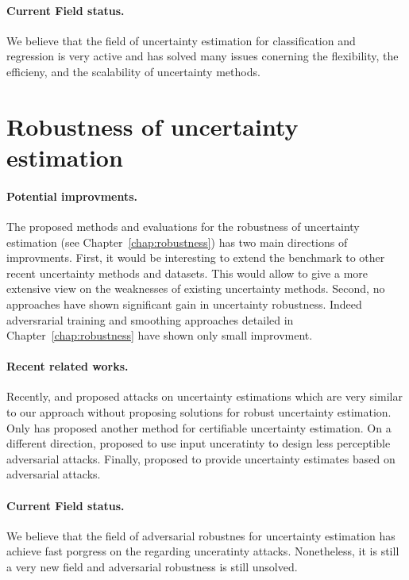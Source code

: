 \paragraph{Current Field status.} We believe that the field of uncertainty estimation for classification and regression is very active and has solved many issues conerning the flexibility, the efficieny, and the scalability of uncertainty methods.

\section{Robustness of uncertainty estimation} 

\paragraph{Potential improvments.} The proposed methods and evaluations for the robustness of uncertainty estimation (see Chapter~\ref{chap:robustness}) has two main directions of improvments. First, it would be interesting to extend the benchmark to other recent uncertainty methods and datasets. This would allow to give a more extensive view on the weaknesses of existing uncertainty methods. Second, no approaches have shown significant gain in uncertainty robustness. Indeed adversrarial training and smoothing approaches detailed in Chapter~\ref{chap:robustness} have shown only small improvment.

\paragraph{Recent related works.} Recently, \cite{galil2021disrupting} and \cite{huimin2022attackingOOD} proposed attacks on uncertainty estimations which are very similar to our approach without proposing solutions for robust uncertainty estimation. Only \cite{meinke2021provably} has proposed another method for certifiable uncertainty estimation. On a different direction, \cite{dia2021localizeduncertainty} proposed to use input unceratinty to design less perceptible adversarial attacks. Finally, \cite{alarab2021attackucertainty} proposed to provide uncertainty estimates based on adversarial attacks.

\paragraph{Current Field status.} We believe that the field of adversarial robustnes for uncertainty estimation has achieve fast porgress on the regarding unceratinty attacks. Nonetheless, it is still a very new field and adversarial robustness is still unsolved. 

